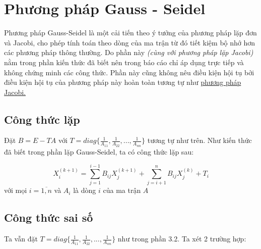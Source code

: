\section{Phương pháp Gauss - Seidel}
    \par Phương pháp Gauss-Seidel là một cải tiến theo ý tưởng của phương pháp lặp đơn và Jacobi, cho phép tính toán theo dòng của ma trận từ đó tiết kiệm bộ nhớ hơn các phương pháp thông thường. Do phần này \textit{(cùng với phương pháp lặp Jacobi)} nằm trong phần kiến thức đã biết nên trong báo cáo chỉ áp dụng trực tiếp và không chứng minh các công thức. Phần này cũng không nêu điều kiện hội tụ bởi điều kiện hội tụ của phương pháp này hoàn toàn tương tự như \hyperlink{jacobi.math.convergence}{phương pháp Jacobi.}


\subsection{Công thức lặp}
    \par Đặt $B = E - TA$ với $T = diag\{\frac{1}{A_{11}}, \frac{1}{A_{22}},..., \frac{1}{A_{nn}}\} $ tương tự như trên. Như kiến thức đã biết trong phần lặp Gauss-Seidel, ta có công thức lặp sau\cite{giaotrinhgiaitichso}:

    \begin{equation}
        X_{i}^{(k+1)} = \sum\limits_{j=1}^{i-1} B_{ij}X_{j}^{(k+1)} + \sum\limits_{j=i+1}^{n} B_{ij}X_{j}^{(k)} + T_{i}
    \end{equation}
    với mọi $i = \overline{1,n}$ và $A_{i}$ là dòng $i$ của ma trận $A$

\subsection{Công thức sai số}

    Ta vẫn đặt $ T = diag\{\frac{1}{A_{11}}, \frac{1}{A_{22}},..., \frac{1}{A_{nn}}\} $ như trong phần 3.2. Ta xét 2 trường hợp:

